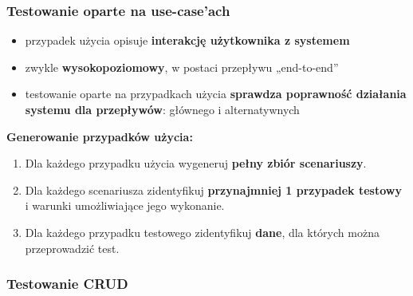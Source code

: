 \documentclass[../main.tex]{subfiles}
\begin{document}
    \subsubsection{Testowanie oparte na use-case'ach}
    \begin{itemize}
        \item przypadek użycia opisuje \textbf{interakcję użytkownika z systemem}
        \item zwykle \textbf{wysokopoziomowy}, w postaci przepływu „end-to-end”
        \item testowanie oparte na przypadkach użycia \textbf{sprawdza poprawność
        działania systemu dla przepływów}: głównego i alternatywnych
    \end{itemize}

    \textbf{Generowanie przypadków użycia:}
    \begin{enumerate}
        \item Dla każdego przypadku użycia wygeneruj \textbf{pełny zbiór scenariuszy}.
        \item Dla każdego scenariusza zidentyfikuj \textbf{przynajmniej 1 przypadek testowy} i warunki
        umożliwiające jego wykonanie.
        \item Dla każdego przypadku testowego zidentyfikuj \textbf{dane}, dla których można przeprowadzić test.
    \end{enumerate}

    \subsubsection{Testowanie CRUD}
\end{document}
